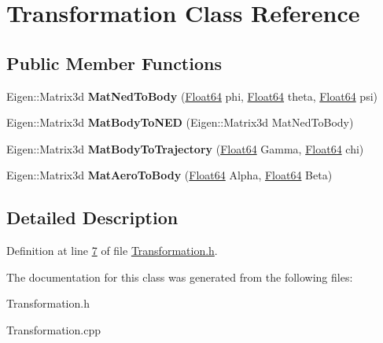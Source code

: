 \hypertarget{class_transformation}{}\section{Transformation Class Reference}
\label{class_transformation}
\subsection*{Public Member Functions}
\begin{DoxyCompactItemize}
\item 
\mbox{\label{class_transformation_ab33befedbf4f290a0c03367a7fb23e6e}} 
Eigen\+::\+Matrix3d {\bfseries Mat\+Ned\+To\+Body} (\hyperlink{group___tools_ga3f1431cb9f76da10f59246d1d743dc2c}{Float64} phi, \hyperlink{group___tools_ga3f1431cb9f76da10f59246d1d743dc2c}{Float64} theta, \hyperlink{group___tools_ga3f1431cb9f76da10f59246d1d743dc2c}{Float64} psi)
\item 
\mbox{\label{class_transformation_a2c16407225610227ee0c9d2fd2242a29}} 
Eigen\+::\+Matrix3d {\bfseries Mat\+Body\+To\+N\+ED} (Eigen\+::\+Matrix3d Mat\+Ned\+To\+Body)
\item 
\mbox{\label{class_transformation_ad5c5314b37b92d73bf18b175cc4022e3}} 
Eigen\+::\+Matrix3d {\bfseries Mat\+Body\+To\+Trajectory} (\hyperlink{group___tools_ga3f1431cb9f76da10f59246d1d743dc2c}{Float64} Gamma, \hyperlink{group___tools_ga3f1431cb9f76da10f59246d1d743dc2c}{Float64} chi)
\item 
\mbox{\label{class_transformation_a9a1ea1611b6e3403ef1f522caf332226}} 
Eigen\+::\+Matrix3d {\bfseries Mat\+Aero\+To\+Body} (\hyperlink{group___tools_ga3f1431cb9f76da10f59246d1d743dc2c}{Float64} Alpha, \hyperlink{group___tools_ga3f1431cb9f76da10f59246d1d743dc2c}{Float64} Beta)
\end{DoxyCompactItemize}


\subsection{Detailed Description}


Definition at line \hyperlink{_transformation_8h_source_l00007}{7} of file \hyperlink{_transformation_8h_source}{Transformation.\+h}.



The documentation for this class was generated from the following files\+:\begin{DoxyCompactItemize}
\item 
Transformation.\+h\item 
Transformation.\+cpp\end{DoxyCompactItemize}

